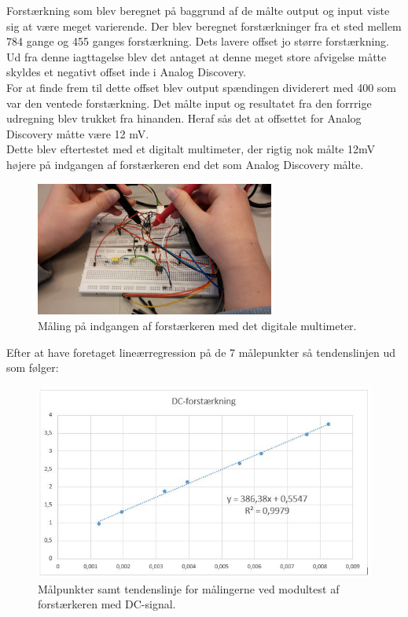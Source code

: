 Forstærkning som blev beregnet på baggrund af de målte output og input viste sig at være meget varierende. Der blev beregnet forstærkninger fra et sted mellem 784 gange og 455 ganges forstærkning. Dets lavere offset jo større forstærkning. Ud fra denne iagttagelse blev det antaget at denne meget store afvigelse måtte skyldes et negativt offset inde i Analog Discovery. 
\\For at finde frem til dette offset blev output spændingen dividerert med 400 som var den ventede forstærkning. Det målte input og resultatet fra den forrrige udregning blev trukket fra hinanden. Heraf sås det at offsettet for Analog Discovery måtte være 12 mV.\\
Dette blev eftertestet med et digitalt multimeter, der rigtig nok målte 12mV højere på indgangen af forstærkeren end det som Analog Discovery målte. 

\begin{figure}[H]
	\centering
	\includegraphics[width=0.7\textwidth]{Figurer/Hardware/DigitalMultimeter}
	\caption{Måling på indgangen af forstærkeren med det digitale multimeter.}
	\label{fig:DigitalMulti}
\end{figure}

Efter at have foretaget lineærregression på de 7 målepunkter så tendenslinjen ud som følger:

\begin{figure}[H]
	\centering
	\includegraphics[width=1\textwidth]{Figurer/Hardware/DCforstaerkning}
	\caption{Målpunkter samt tendenslinje for målingerne ved modultest af forstærkeren med DC-signal.}
	\label{fig:DCModul}
\end{figure}

